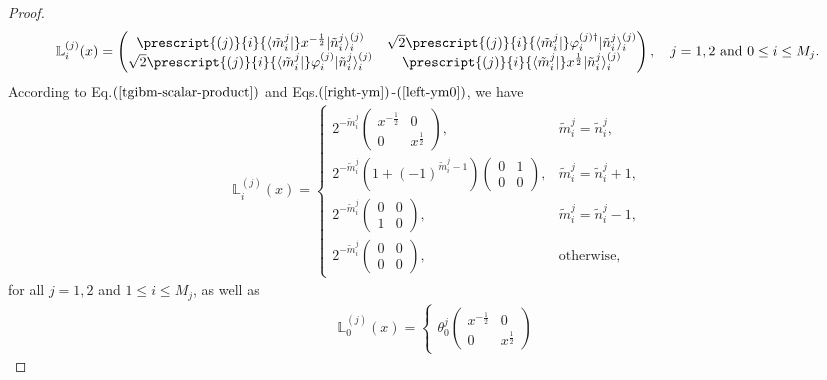 \documentclass[11pt,reqno]{amsart}
\numberwithin{equation}{section}
\begin{document}
\begin{proof}
\begin{align}
			\mathbb{L}_{i}^{(j)}(x) =
			\begin{pmatrix}
				\prescript{(j)}{i}{\langle \tilde{m}^{j}_i|}  x^{- \frac{1}{2}} | \tilde{n}_i^{j} \rangle_i^{(j)} & \sqrt{2}\prescript{(j)}{i}{\langle \tilde{m}^{j}_i|}\varphi_i^{(j)\dagger} | \tilde{n}_i^{j} \rangle_i^{(j)} \\
				\sqrt{2}\prescript{(j)}{i}{\langle \tilde{m}^{j}_i|}\varphi_i^{(j)} | \tilde{n}_i^{j} \rangle_i^{(j)} &\prescript{(j)}{i}{\langle \tilde{m}^{j}_i|} x^{\frac{1}{2}}
				| \tilde{n}_i^{j} \rangle_i^{(j)}
			\end{pmatrix} , \quad j=1,2  \text{~and~} 0\leq i \leq M_{j}.
		\end{align}
		According to Eq.$(\ref{tgibm-scalar-product})$ and Eqs.$(\ref{right-ym})$-$(\ref{left-ym0})$,  we have
		\begin{align}
			\mathbb{L}_{i}^{(j)}(x) =
			\begin{cases}
				2^{-\tilde{m}_{i}^{j}}
				\begin{pmatrix}
					x^{-\frac{1}{2}} & 0 \\
					0 & x^{\frac{1}{2}}
				\end{pmatrix}, & \tilde{m}_i^{j} = \tilde{n}_i^{j}, \\
				2^{-\tilde{m}_{i}^{j}} (1 + (-1)^{\tilde{m}_i^{j}-1})
				\begin{pmatrix}
					0 & 1 \\
					0 & 0
				\end{pmatrix}, & \tilde{m}^{j}_i = \tilde{n}_i^{j} + 1, \\
				2^{-\tilde{m}_{i}^{j}}
				\begin{pmatrix}
					0 & 0 \\
					1 & 0
				\end{pmatrix}, & \tilde{m}_i^{j} = \tilde{n}_i^{j} - 1, \\
				2^{-\tilde{m}_{i}^{j}}
				\begin{pmatrix}
					0 & 0 \\
					0 & 0
				\end{pmatrix}, & \text{otherwise},
			\end{cases}
		\end{align}
		for all $j=1,2$ and $1\leq i \leq M_{j}$, as well as
		\begin{align}
			\mathbb{L}_{0}^{(j)}(x) =
			\begin{cases}
				\theta_0^{j}
				\begin{pmatrix}
					x^{-\frac{1}{2}} & 0 \\
					0 & x^{\frac{1}{2}}

\end{pmatrix}
\end{cases}
\end{align}
\end{proof}
\end{document}
